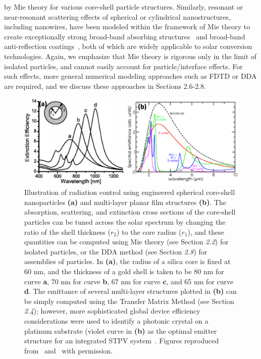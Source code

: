 \documentclass[review]{elsarticle}
\begin{document}
by Mie theory for various core-shell particle structures.  
Similarly, resonant or near-resonant scattering effects of spherical or cylindrical 
nanostructures, including nanowires, have been modeled within the framework of Mie theory to create exceptionally strong broad-band absorbing structures~\cite{FKA_OptExp_2014}
and broad-band anti-reflection coatings~\cite{SVP_NatComm_2012}, both of which are 
widely applicable to solar conversion technologies.  Again, we emphasize that Mie theory is rigorous only in the limit of isolated particles, 
and cannot easily account for particle/interface effects.
For such effects, more general numerical modeling approaches such as FDTD or DDA are required, and we discuss these approaches in Sections 2.6-2.8.

\begin{figure}[ht!]
\begin{center}
        \includegraphics[width=\textwidth]{Halas_Celanovic}
        \caption{\label{Halas}  Illustration of radiation control using engineered spherical core-shell
nanoparticles {\bf (a)} and multi-layer planar film structures {\bf (b)}.
The absorption, scattering, and extinction cross sections of the core-shell particles can be tuned
across the solar spectrum by changing the ratio of the shell thickness ($r_2$) to the core radius ($r_1$), 
and these
quantities can be computed using Mie theory (see Section {\it 2.2}) for isolated particles, or the 
DDA method (see Section {\it 2.8}) for assemblies of particles.
In {\bf (a)}, the radius of a silica core is fixed at 60 nm, and the thickness of a gold shell is
taken to be 80 nm for curve {\bf a},
70 nm for curve {\bf b}, 67 nm for curve {\bf c}, and 65 nm for curve {\bf d}.
The emittance of several multi-layer structures plotted in {\bf (b)} can be simply computed
using the Transfer Matrix Method (see Section {\it 2.4}); however, 
more sophisticated global device
efficiency considerations were used to identify a photonic crystal on a platinum substrate 
(violet curve in {\bf (b)} as the optimal emitter structure for
an integrated STPV system~\cite{g4}.
Figures reproduced from~\cite{CH_APL_2006} and~\cite{g4} with permission.}
\end{center}
\end{figure}
\end{document}
